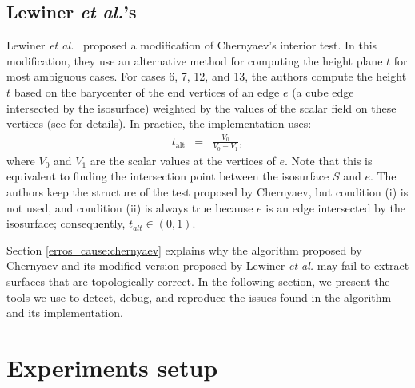 \subsection{Lewiner \emph{et al.}'s \mc{}}

Lewiner \emph{et al.}~\cite{Lewiner:2003} proposed a modification of Chernyaev's interior test. In this modification, they use an alternative method for computing the height plane $t$ for most ambiguous cases. For cases  6, 7, 12, and 13, the authors compute the height $t$ based on the barycenter of the end vertices of an edge $e$ (a cube edge intersected by the isosurface) weighted by the values of the scalar field on these vertices (see \cite{Lewiner:2003} for details). In practice, the implementation uses:
\begin{eqnarray}
t_{\mathrm{alt}} &=& \frac{V_{0}}{V_{0} - V_{1}},\label{eq:alternative}
\end{eqnarray}
where $V_{0}$ and $V_{1}$ are the scalar values at the vertices of $e$. Note that this is equivalent to finding the intersection point between the isosurface $S$ and $e$. The authors keep the structure of the test proposed by Chernyaev, but condition (i) is not used, and condition (ii) is always true because $e$ is an edge intersected by the isosurface; consequently, $t_{alt} \in (0,1)$.

Section \ref{erros_cause:chernyaev} explains why the algorithm proposed by Chernyaev and its modified version proposed by Lewiner \emph{et al.} may fail to extract surfaces that are topologically correct. In the following section, we present the tools we use to detect, debug, and reproduce the issues found in the \mc{} algorithm and its implementation.

\section{Experiments setup}
\label{experiments_setup}


